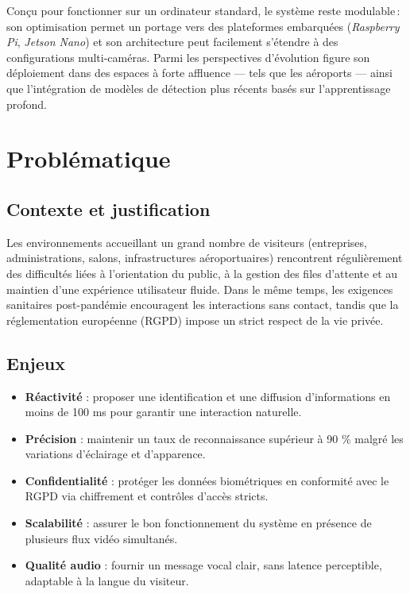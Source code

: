 \documentclass[12pt,a4paper]{article}
\begin{document}
Conçu pour fonctionner sur un ordinateur standard, le système reste modulable\,: son optimisation permet un portage vers des plateformes embarquées (\textit{Raspberry Pi}, \textit{Jetson Nano}) et son architecture peut facilement s’étendre à des configurations multi-caméras. Parmi les perspectives d’évolution figure son déploiement dans des espaces à forte affluence — tels que les aéroports — ainsi que l’intégration de modèles de détection plus récents basés sur l’apprentissage profond.

\section{Problématique}

\subsection{Contexte et justification}
Les environnements accueillant un grand nombre de visiteurs (entreprises, administrations, salons, infrastructures aéroportuaires) rencontrent régulièrement des difficultés liées à l’orientation du public, à la gestion des files d’attente et au maintien d’une expérience utilisateur fluide. Dans le même temps, les exigences sanitaires post-pandémie encouragent les interactions sans contact, tandis que la réglementation européenne (RGPD) impose un strict respect de la vie privée.

\subsection{Enjeux}
\begin{itemize}
  \item \textbf{Réactivité} : proposer une identification et une diffusion d’informations en moins de 100 ms pour garantir une interaction naturelle.
  \item \textbf{Précision} : maintenir un taux de reconnaissance supérieur à 90 \% malgré les variations d’éclairage et d’apparence.
  \item \textbf{Confidentialité} : protéger les données biométriques en conformité avec le RGPD via chiffrement et contrôles d’accès stricts.
  \item \textbf{Scalabilité} : assurer le bon fonctionnement du système en présence de plusieurs flux vidéo simultanés.
  \item \textbf{Qualité audio} : fournir un message vocal clair, sans latence perceptible, adaptable à la langue du visiteur.
\end{itemize}
\end{document}
